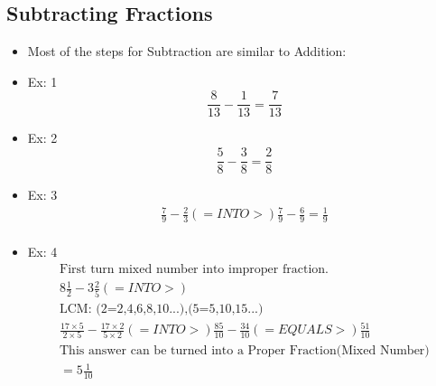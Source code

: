 \documentclass[]{article}
\begin{document}
\subsection{Subtracting Fractions}
\begin{itemize}
	\item Most of the steps for Subtraction are similar to Addition:
	\item Ex: 1
	\begin{equation}
		\frac{8}{13} - \frac{1}{13} = \frac{7}{13}
	\end{equation}
	\item Ex: 2
	\begin{equation}
		\frac{5}{8} - \frac{3}{8} = \frac{2}{8}
	\end{equation}
	\item Ex: 3
	\begin{align}
	\frac{7}{9} - \frac{2}{3} (=INTO>) \frac{7}{9} - \frac{6}{9} = \frac{1}{9}\\
	\end{align}
	\item Ex: 4
	 \begin{gather*}
	 \text{First turn mixed number into improper fraction.} \\	
		8 \frac{1}{2} - 3 \frac{2}{5} (=INTO>)   \\
		\text{LCM: (2=2,4,6,8,10...),(5=5,10,15...)} \\
		\frac{17 \times 5}{2 \times 5} - \frac{17 \times 2}{5 \times 2} (=INTO>) \frac{85}{10} - \frac{34}{10} (=EQUALS>) \frac{51}{10}\\
		\text{This answer can be turned into a Proper Fraction(Mixed Number)} \\
		= 5 \frac{1}{10}
	\end{gather*}
\end{itemize}
\end{document}
